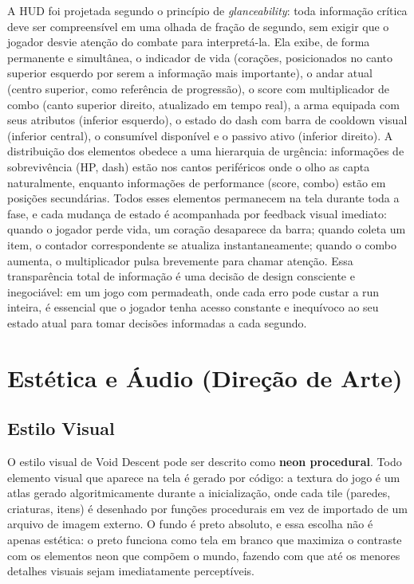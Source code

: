 \documentclass[12pt, a4paper]{article}
\begin{document}
A HUD foi projetada segundo o princ\'ipio de \textit{glanceability}: toda informa\c{c}\~ao cr\'itica deve ser compreens\'ivel em uma olhada de fra\c{c}\~ao de segundo, sem exigir que o jogador desvie aten\c{c}\~ao do combate para interpret\'a-la. Ela exibe, de forma permanente e simult\^anea, o indicador de vida (cora\c{c}\~oes, posicionados no canto superior esquerdo por serem a informa\c{c}\~ao mais importante), o andar atual (centro superior, como refer\^encia de progress\~ao), o score com multiplicador de combo (canto superior direito, atualizado em tempo real), a arma equipada com seus atributos (inferior esquerdo), o estado do dash com barra de cooldown visual (inferior central), o consum\'ivel dispon\'ivel e o passivo ativo (inferior direito). A distribui\c{c}\~ao dos elementos obedece a uma hierarquia de urg\^encia: informa\c{c}\~oes de sobreviv\^encia (HP, dash) est\~ao nos cantos perif\'ericos onde o olho as capta naturalmente, enquanto informa\c{c}\~oes de performance (score, combo) est\~ao em posi\c{c}\~oes secund\'arias. Todos esses elementos permanecem na tela durante toda a fase, e cada mudan\c{c}a de estado \'e acompanhada por feedback visual imediato: quando o jogador perde vida, um cora\c{c}\~ao desaparece da barra; quando coleta um item, o contador correspondente se atualiza instantaneamente; quando o combo aumenta, o multiplicador pulsa brevemente para chamar aten\c{c}\~ao. Essa transpar\^encia total de informa\c{c}\~ao \'e uma decis\~ao de design consciente e inegoci\'avel: em um jogo com permadeath, onde cada erro pode custar a run inteira, \'e essencial que o jogador tenha acesso constante e inequ\'ivoco ao seu estado atual para tomar decis\~oes informadas a cada segundo.

\section{Est\'etica e \'Audio (Dire\c{c}\~ao de Arte)}

\subsection{Estilo Visual}

O estilo visual de Void Descent pode ser descrito como \textbf{neon procedural}. Todo elemento visual que aparece na tela \'e gerado por c\'odigo: a textura do jogo \'e um atlas gerado algoritmicamente durante a inicializa\c{c}\~ao, onde cada tile (paredes, criaturas, itens) \'e desenhado por fun\c{c}\~oes procedurais em vez de importado de um arquivo de imagem externo. O fundo \'e preto absoluto, e essa escolha n\~ao \'e apenas est\'etica: o preto funciona como tela em branco que maximiza o contraste com os elementos neon que comp\~oem o mundo, fazendo com que at\'e os menores detalhes visuais sejam imediatamente percept\'iveis.
\end{document}
